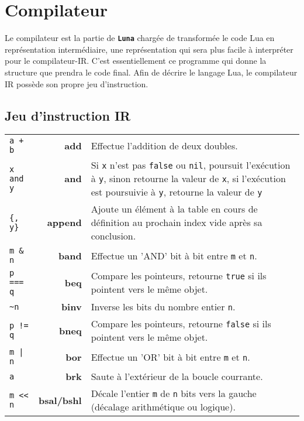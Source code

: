 \documentclass{article}
\newcommand{\luna}{\textbf{\texttt{Luna}}}
\begin{document}
\newpage
\section{Compilateur}
Le compilateur est la partie de \luna{} chargée de transformée le code Lua en représentation intermédiaire, une représentation qui sera plus facile à interpréter pour le compilateur-IR. C'est essentiellement ce programme qui donne la structure que prendra le code final. Afin de décrire le langage Lua, le compilateur IR possède son propre jeu d'instruction.
\subsection{Jeu d'instruction IR}
\label{subsec:instructions}
\begin{longtable}{p{2cm} r p{12cm}}
  {\lstinline$a + b$} & \textbf{add} & Effectue l'addition de deux doubles.\\
  {\lstinline$x and y$} & \textbf{and} & Si \texttt{x} n'est pas {\lstset{style=lua}\lstinline$false$} ou {\lstset{style=lua}\lstinline$nil$}, poursuit l'exécution à \texttt{y}, sinon retourne la valeur de \texttt{x}, si l'exécution est poursuivie à \texttt{y}, retourne la valeur de \texttt{y}\\
  {\lstset{style=lua}\lstinline${, y}$} & \textbf{append} & Ajoute un élément à la table en cours de définition au prochain index vide après sa conclusion.\\
  {\lstinline$m & n$} & \textbf{band} & Effectue un 'AND' bit à bit entre \texttt{m} et \texttt{n}.\\
  {\lstinline$p === q$} & \textbf{beq} & Compare les pointeurs, retourne {\lstset{style=lua}\lstinline$true$} si ils pointent vers le même objet.\\
  {\lstinline$~n$} & \textbf{binv} & Inverse les bits du nombre entier \texttt{n}.\\
  {\lstinline$p != q$} & \textbf{bneq} & Compare les pointeurs, retourne {\lstset{style=lua}\lstinline$false$} si ils pointent vers le même objet.\\
  {\lstinline$m | n$} & \textbf{bor} & Effectue un 'OR' bit à bit entre \texttt{m} et \texttt{n}.\\
  {\lstset{style=lua}\lstinline$a$} & \textbf{brk} & Saute à l'extérieur de la boucle courrante.\\
  {\lstinline$m << n$} & \textbf{bsal/bshl} &  Décale l'entier \texttt{m} de \texttt{n} bits vers la gauche (décalage arithmétique ou logique).\\

\end{longtable}
\end{document}
